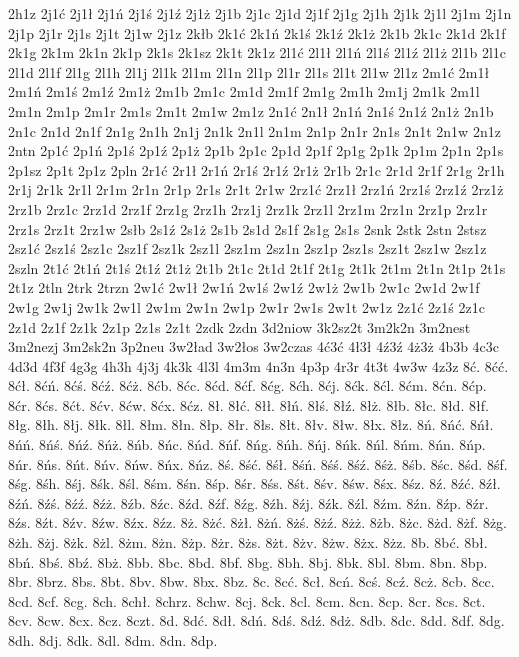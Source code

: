 {2h1z
2j1ć
2j1ł
2j1ń
2j1ś
2j1ź
2j1ż
2j1b
2j1c
2j1d
2j1f
2j1g
2j1h
2j1k
2j1l
2j1m
2j1n
2j1p
2j1r
2j1s
2j1t
2j1w
2j1z
2kłb
2k1ć
2k1ń
2k1ś
2k1ź
2k1ż
2k1b
2k1c
2k1d
2k1f
2k1g
2k1m
2k1n
2k1p
2k1s
2k1sz
2k1t
2k1z
2l1ć
2l1ł
2l1ń
2l1ś
2l1ź
2l1ż
2l1b
2l1c
2l1d
2l1f
2l1g
2l1h
2l1j
2l1k
2l1m
2l1n
2l1p
2l1r
2l1s
2l1t
2l1w
2l1z
2m1ć
2m1ł
2m1ń
2m1ś
2m1ź
2m1ż
2m1b
2m1c
2m1d
2m1f
2m1g
2m1h
2m1j
2m1k
2m1l
2m1n
2m1p
2m1r
2m1s
2m1t
2m1w
2m1z
2n1ć
2n1ł
2n1ń
2n1ś
2n1ź
2n1ż
2n1b
2n1c
2n1d
2n1f
2n1g
2n1h
2n1j
2n1k
2n1l
2n1m
2n1p
2n1r
2n1s
2n1t
2n1w
2n1z
2ntn
2p1ć
2p1ń
2p1ś
2p1ź
2p1ż
2p1b
2p1c
2p1d
2p1f
2p1g
2p1k
2p1m
2p1n
2p1s
2p1sz
2p1t
2p1z
2pln
2r1ć
2r1ł
2r1ń
2r1ś
2r1ź
2r1ż
2r1b
2r1c
2r1d
2r1f
2r1g
2r1h
2r1j
2r1k
2r1l
2r1m
2r1n
2r1p
2r1s
2r1t
2r1w
2rz1ć
2rz1ł
2rz1ń
2rz1ś
2rz1ź
2rz1ż
2rz1b
2rz1c
2rz1d
2rz1f
2rz1g
2rz1h
2rz1j
2rz1k
2rz1l
2rz1m
2rz1n
2rz1p
2rz1r
2rz1s
2rz1t
2rz1w
2słb
2s1ź
2s1ż
2s1b
2s1d
2s1f
2s1g
2s1s
2snk
2stk
2stn
2stsz
2sz1ć
2sz1ś
2sz1c
2sz1f
2sz1k
2sz1l
2sz1m
2sz1n
2sz1p
2sz1s
2sz1t
2sz1w
2sz1z
2szln
2t1ć
2t1ń
2t1ś
2t1ź
2t1ż
2t1b
2t1c
2t1d
2t1f
2t1g
2t1k
2t1m
2t1n
2t1p
2t1s
2t1z
2tln
2trk
2trzn
2w1ć
2w1ł
2w1ń
2w1ś
2w1ź
2w1ż
2w1b
2w1c
2w1d
2w1f
2w1g
2w1j
2w1k
2w1l
2w1m
2w1n
2w1p
2w1r
2w1s
2w1t
2w1z
2z1ć
2z1ś
2z1c
2z1d
2z1f
2z1k
2z1p
2z1s
2z1t
2zdk
2zdn
3d2niow
3k2sz2t
3m2k2n
3m2nest
3m2nezj
3m2sk2n
3p2neu
3w2ład
3w2łos
3w2czas
4ć3ć
4ł3ł
4ź3ź
4ż3ż
4b3b
4c3c
4d3d
4f3f
4g3g
4h3h
4j3j
4k3k
4l3l
4m3m
4n3n
4p3p
4r3r
4t3t
4w3w
4z3z
8ć.
8ćć.
8ćł.
8ćń.
8ćś.
8ćź.
8ćż.
8ćb.
8ćc.
8ćd.
8ćf.
8ćg.
8ćh.
8ćj.
8ćk.
8ćl.
8ćm.
8ćn.
8ćp.
8ćr.
8ćs.
8ćt.
8ćv.
8ćw.
8ćx.
8ćz.
8ł.
8łć.
8łł.
8łń.
8łś.
8łź.
8łż.
8łb.
8łc.
8łd.
8łf.
8łg.
8łh.
8łj.
8łk.
8łl.
8łm.
8łn.
8łp.
8łr.
8łs.
8łt.
8łv.
8łw.
8łx.
8łz.
8ń.
8ńć.
8ńł.
8ńń.
8ńś.
8ńź.
8ńż.
8ńb.
8ńc.
8ńd.
8ńf.
8ńg.
8ńh.
8ńj.
8ńk.
8ńl.
8ńm.
8ńn.
8ńp.
8ńr.
8ńs.
8ńt.
8ńv.
8ńw.
8ńx.
8ńz.
8ś.
8ść.
8śł.
8śń.
8śś.
8śź.
8śż.
8śb.
8śc.
8śd.
8śf.
8śg.
8śh.
8śj.
8śk.
8śl.
8śm.
8śn.
8śp.
8śr.
8śs.
8śt.
8śv.
8św.
8śx.
8śz.
8ź.
8źć.
8źł.
8źń.
8źś.
8źź.
8źż.
8źb.
8źc.
8źd.
8źf.
8źg.
8źh.
8źj.
8źk.
8źl.
8źm.
8źn.
8źp.
8źr.
8źs.
8źt.
8źv.
8źw.
8źx.
8źz.
8ż.
8żć.
8żł.
8żń.
8żś.
8żź.
8żż.
8żb.
8żc.
8żd.
8żf.
8żg.
8żh.
8żj.
8żk.
8żl.
8żm.
8żn.
8żp.
8żr.
8żs.
8żt.
8żv.
8żw.
8żx.
8żz.
8b.
8bć.
8bł.
8bń.
8bś.
8bź.
8bż.
8bb.
8bc.
8bd.
8bf.
8bg.
8bh.
8bj.
8bk.
8bl.
8bm.
8bn.
8bp.
8br.
8brz.
8bs.
8bt.
8bv.
8bw.
8bx.
8bz.
8c.
8cć.
8cł.
8cń.
8cś.
8cź.
8cż.
8cb.
8cc.
8cd.
8cf.
8cg.
8ch.
8chł.
8chrz.
8chw.
8cj.
8ck.
8cl.
8cm.
8cn.
8cp.
8cr.
8cs.
8ct.
8cv.
8cw.
8cx.
8cz.
8czt.
8d.
8dć.
8dł.
8dń.
8dś.
8dź.
8dż.
8db.
8dc.
8dd.
8df.
8dg.
8dh.
8dj.
8dk.
8dl.
8dm.
8dn.
8dp.
}

